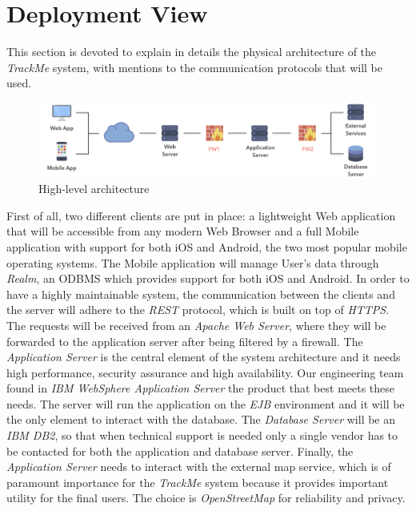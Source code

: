\section{Deployment View}

This section is devoted to explain in details the physical architecture of the \textit{TrackMe} system, with mentions to the communication protocols that will be used.


\begin{figure}[H]

\includegraphics[scale=0.32,keepaspectratio]{./Pictures/high-level-firewall.png}
\centering
\caption{High-level architecture}

\end{figure}

First of all, two different clients are put in place: a lightweight Web application that will be accessible from any modern Web Browser and a full Mobile application with support for both iOS and Android, the two most popular mobile operating systems. The Mobile application will manage User's data through \textit{Realm}, an ODBMS which provides support for both iOS and Android. In order to have a highly maintainable system, the communication between the clients and the server will adhere to the \textit{REST} protocol, which is built on top of \textit{HTTPS}. 
The requests will be received from an \textit{Apache Web Server}, where they will be forwarded to the application server after being filtered by a firewall.
The \textit{Application Server} is the central element of the system architecture and it needs high performance, security assurance and high availability. Our engineering team found in \textit{IBM WebSphere Application Server} the product that best meets these needs. The server will run the application on the \textit{EJB} environment and it will be the only element to interact with the database. The \textit{Database Server} will be an \textit{IBM DB2}, so that when technical support is needed only a single vendor has to be contacted for both the application and database server.
Finally, the \textit{Application Server} needs to interact with the external map service, which is of paramount importance for the \textit{TrackMe} system because it provides important utility for the final users. The choice is \textit{OpenStreetMap} for reliability and privacy.

